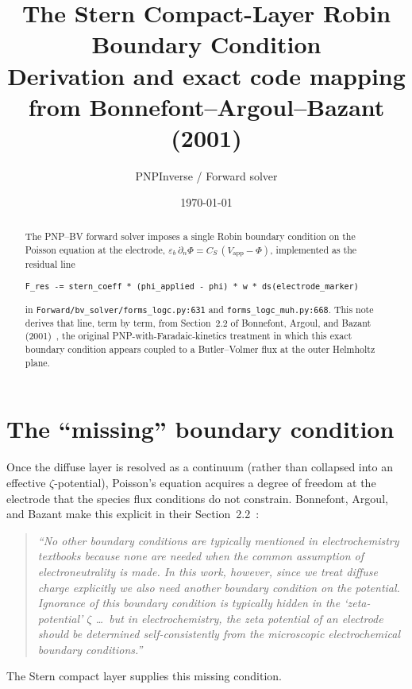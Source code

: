 \documentclass[11pt]{article}
\title{The Stern Compact-Layer Robin Boundary Condition\\
       \large Derivation and exact code mapping from
              Bonnefont--Argoul--Bazant (2001)}
\author{PNPInverse / Forward solver}
\date{\today}
\newcommand{\CS}{C_{\!S}}
\newcommand{\eb}{\varepsilon_{b}}
\begin{document}
\maketitle

\begin{abstract}
The PNP--BV forward solver imposes a single Robin boundary condition
on the Poisson equation at the electrode,
$\eb\,\partial_{n}\Phi = \CS\,(V_{\mathrm{app}}-\Phi)$, implemented as
the residual line
\begin{verbatim}
F_res -= stern_coeff * (phi_applied - phi) * w * ds(electrode_marker)
\end{verbatim}
in \texttt{Forward/bv\_solver/forms\_logc.py:631} and
\texttt{forms\_logc\_muh.py:668}. This note derives that line, term by
term, from Section~2.2 of Bonnefont, Argoul, and Bazant
(2001)~\cite{bonnefont2001}, the original PNP-with-Faradaic-kinetics
treatment in which this exact boundary condition appears coupled to a
Butler--Volmer flux at the outer Helmholtz plane.
\end{abstract}

\section{The ``missing'' boundary condition}

Once the diffuse layer is resolved as a continuum (rather than
collapsed into an effective $\zeta$-potential), Poisson's equation
acquires a degree of freedom at the electrode that the species flux
conditions do not constrain. Bonnefont, Argoul, and Bazant make this
explicit in their Section~2.2~\cite[p.~54]{bonnefont2001}:

\begin{quote}
\emph{``No other boundary conditions are typically mentioned in
electrochemistry textbooks because none are needed when the common
assumption of electroneutrality is made. In this work, however, since
we treat diffuse charge explicitly we also need another boundary
condition on the potential. Ignorance of this boundary condition is
typically hidden in the `zeta-potential' $\zeta$ \dots\ but in
electrochemistry, the zeta potential of an electrode should be
determined self-consistently from the microscopic electrochemical
boundary conditions.''}
\end{quote}

The Stern compact layer supplies this missing condition.
\end{document}
